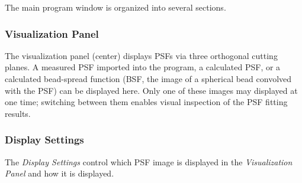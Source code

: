 \documentclass[11pt,titlepage,twoside]{article}
\begin{document}
The main program window is organized into several sections. 

\subsubsection{Visualization Panel}

The visualization panel (center) displays PSFs via three orthogonal cutting planes. A measured PSF imported into the program, a calculated PSF, or a calculated bead-spread function (BSF, the image of a spherical bead convolved with the PSF) can be displayed here. Only one of these images may displayed at one time; switching between them enables visual inspection of the PSF fitting results.

\subsubsection{Display Settings}

The \emph{Display Settings} control which PSF image is displayed in the \emph{Visualization Panel} and how it is displayed.
\end{document}
